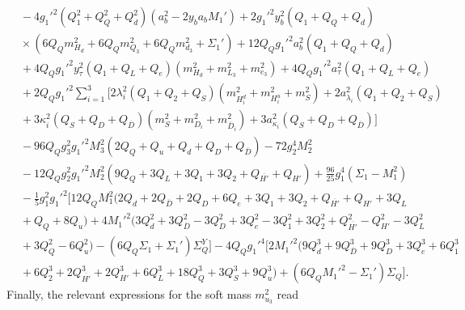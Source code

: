 \documentclass[preprint,amsmath,amssymb,aps,superscriptaddress,prd,
showpacs,floatfix,nofootinbib]{revtex4-1}
\begin{document}
\begin{subequations}
\begin{align}
& {} - 4 g_1'^2 \left ( Q_1^2 + Q_Q^2 + Q_d^2 \right ) \left ( a_b^2 -
2 y_b a_b M_1' \right ) + 2 g_1'^2 y_b^2 \left ( Q_1 + Q_Q + Q_d \right )
\nonumber \\
& {} \times \left ( 6 Q_Q m_{H_d}^2 + 6 Q_Q m_{Q_3}^2 + 6 Q_Q m_{d_3}^2 +
\Sigma_1' \right ) + 12 Q_Q g_1'^2 a_b^2 \left ( Q_1 + Q_Q + Q_d \right )
\nonumber \\
& {} + 4 Q_Q g_1'^2 y_\tau^2 \left ( Q_1 + Q_L + Q_e \right ) \left (
m_{H_d}^2 + m_{L_3}^2 + m_{e_3}^2 \right ) + 4 Q_Q g_1'^2 a_\tau^2 \left (
Q_1 + Q_L + Q_e \right ) \nonumber \\
& {} + 2 Q_Q g_1'^2 \sum_{i=1}^3 \Big [ 2 \lambda_i^2 \left ( Q_1 + Q_2 + Q_S
\right ) \left ( m_{H_i^d}^2 + m_{H_i^u}^2 + m_S^2 \right ) +
2 a_{\lambda_i}^2 \left ( Q_1 + Q_2 + Q_S \right ) \nonumber \\
& {} + 3 \kappa_i^2 \left ( Q_S + Q_D + Q_{\overline{D}} \right ) \left (
m_S^2 + m_{D_i}^2 + m_{\overline{D}_i}^2 \right ) + 3 a_{\kappa_i}^2 \left (
Q_S + Q_D + Q_{\overline{D}} \right ) \Big ] \nonumber \\
& {} - 96 Q_Q g_3^2 g_1'^2 M_3^2 \left ( 2 Q_Q + Q_u + Q_d + Q_D +
Q_{\overline{D}} \right ) - 72 g_2^4 M_2^2 \nonumber \\
& {} - 12 Q_Q g_2^2 g_1'^2 M_2^2 \left ( 9 Q_Q + 3 Q_L + 3 Q_1 + 3 Q_2 +
Q_{\overline{H'}} + Q_{H'} \right ) + \frac{96}{25} g_1^4 \left ( \Sigma_1 -
M_1^2 \right ) \nonumber \\
& {} - \frac{1}{5} g_1^2 g_1'^2 \big [ 12 Q_Q M_1^2 \big ( 2 Q_d +
2 Q_{\overline{D}} + 2 Q_D + 6 Q_e + 3 Q_1 + 3 Q_2 + Q_{\overline{H'}} +
Q_{H'} + 3 Q_L \nonumber \\
& {} + Q_Q + 8 Q_u \big ) + 4 M_1'^2 \big ( 3 Q_d^2 + 3 Q_{\overline{D}}^2 -
3 Q_D^2 + 3 Q_e^2 - 3 Q_1^2 + 3 Q_2^2 + Q_{\overline{H'}}^2 - Q_{H'}^2 -
3 Q_L^2 \nonumber \\
& {} + 3 Q_Q^2 - 6 Q_u^2 \big ) - \left ( 6 Q_Q \Sigma_1 + \Sigma_1' \right )
\Sigma_Q^Y \big ] - 4 Q_Q g_1'^4 \big [ 2 M_1'^2 \big ( 9 Q_d^3 +
9 Q_{\overline{D}}^3 + 9 Q_D^3 + 3 Q_e^3 + 6 Q_1^3 \nonumber \\
& {} + 6 Q_2^3 + 2 Q_{\overline{H'}}^3 + 2 Q_{H'}^3 + 6 Q_L^3 + 18 Q_Q^3 +
3 Q_S^3 + 9 Q_u^3 \big ) + \left ( 6 Q_Q M_1'^2 - \Sigma_1' \right )
\Sigma_Q \big ] . \label{eq:USSMmq222Ot2Coeff}
\end{align}
\end{subequations}
Finally, the relevant expressions for the soft mass $m_{u_3}^2$ read
\end{document}
